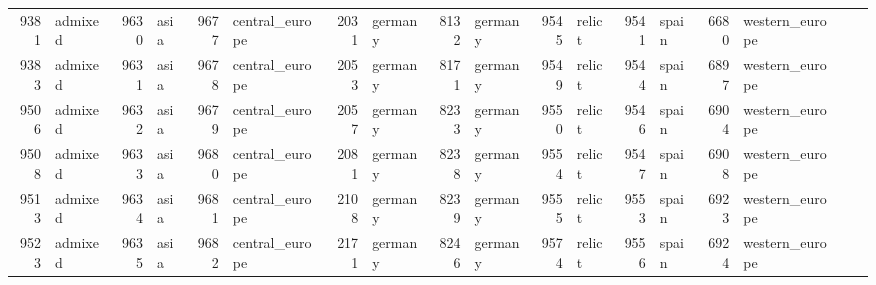\begin{table}[h]
{\begin{tabular}{rl|rl|rl|rl|rl|rl|rl|rl|rl}
			9381                   & admixed         & 9630                   & asia            & 9677                   & central\_europe & 2031                   & germany         & 8132                   & germany                 & 9545                   & relict                  & 9541                   & spain           & 6680                   & western\_europe &                          &                 \\
			9383                   & admixed         & 9631                   & asia            & 9678                   & central\_europe & 2053                   & germany         & 8171                   & germany                 & 9549                   & relict                  & 9544                   & spain           & 6897                   & western\_europe &                          &                 \\
			9506                   & admixed         & 9632                   & asia            & 9679                   & central\_europe & 2057                   & germany         & 8233                   & germany                 & 9550                   & relict                  & 9546                   & spain           & 6904                   & western\_europe &                          &                 \\
			9508                   & admixed         & 9633                   & asia            & 9680                   & central\_europe & 2081                   & germany         & 8238                   & germany                 & 9554                   & relict                  & 9547                   & spain           & 6908                   & western\_europe &                          &                 \\
			9513                   & admixed         & 9634                   & asia            & 9681                   & central\_europe & 2108                   & germany         & 8239                   & germany                 & 9555                   & relict                  & 9553                   & spain           & 6923                   & western\_europe &                          &                 \\
			9523                   & admixed         & 9635                   & asia            & 9682                   & central\_europe & 2171                   & germany         & 8246                   & germany                 & 9574                   & relict                  & 9556                   & spain           & 6924                   & western\_europe &                          &                 \\

\end{tabular}}
\end{table}

